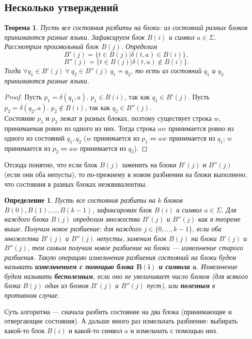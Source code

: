 \documentclass{article}
\newtheorem{theorem}{Теорема}
\newtheorem{definition}{Определение}%
\begin{document}
\subsection{Несколько утверждений}
\begin{theorem} Пусть все состояния разбиты на блоки: из состояний разных блоков принимаются разные языки. Зафиксируем блок $B(i)$ и символ $a \in \Sigma$. Рассмотрим произвольный блок $B(j)$. Определим \[B'(j) = \{ t \in B(j) | \delta(t, a) \in B(i)\},\]
\[B''(j) = \{ t \in B(j) | \delta(t, a) \notin B(i)\}.\]
Тогда $\forall q_1 \in B'(j) \ \forall \ q_2 \in B''(j) \ q_1 \not \sim q_2$, то есть из состояний $q_1$ и $q_2$ принимаются разные языки.
\end{theorem}
\begin{proof}
Пусть $p_1 = \delta(q_1, a)$. $p_1 \in B(i)$, так как $q_1 \in B'(j)$. Пусть $p_2 = \delta(q_2, a)$. $p_2 \not \in B(i)$, так как $q_2 \in B''(j)$.\\
Состояние $p_1$ и $p_2$ лежат в разных блоках, поэтому существует строка $w$, принимаемая ровно из одного из них. Тогда строка $aw$ принимается ровно из одного из состояний $q_1, q_2$ ($w$ принимается из $p_1 \Longleftrightarrow aw$  принимается из $q_1$; $w$ принимается из $p_2 \Longleftrightarrow aw$  принимается из $q_2$).
\end{proof}
Отсюда понятно, что если блок $B(j)$ заменить на блоки $B'(j)$ и $B''(j)$ (если они оба непусты), то по-прежнему в новом разбиении на блоки выполнено, что состояния в разных блоках неэквивалентны.
\begin{definition}
    Пусть все состояния разбиты на $k$ блоков $B(0), B(1), \dots, B(k - 1)$, зафиксирован блок $B(i)$ и символ $a \in \Sigma$. Для каждого блока $B(j)$ определим множества $B'(j)$ и $B''(j)$ как в теореме выше. Получим новое разбиение: для каждого $j \in \{0, \dots, k - 1\}$, если оба множества $B'(j)$ и $B''(j)$ непусты, заменим блок $B(j)$ на блоки $B'(j)$ и $B''(j)$, тем самым получим новое разбиение  на блоки --- измельчение старого разбиения. Такую операцию измельчения разбиения состояний на блоки будем называть \textbf{измельчением с помощью блока $\textbf{B}(\textbf{i})$ и символа $\textbf{a}$}. Измельчение будем называть \textbf{бесполезным}, если оно не увеличивает число блоков (для всякого блока $B(j)$ один из блоков $B'(j)$ и $B''(j)$ пуст), или \textbf{полезным} в противном случае.
\end{definition}
Суть алгоритма --- сначала разбить состояние на два блока (принимающие и отвергающие состояния). А дальше много раз измельчать разбиение: выбирать какой-то блок $B(i)$ и какой-то символ $a$ и измельчать с помощью них.
\end{document}
